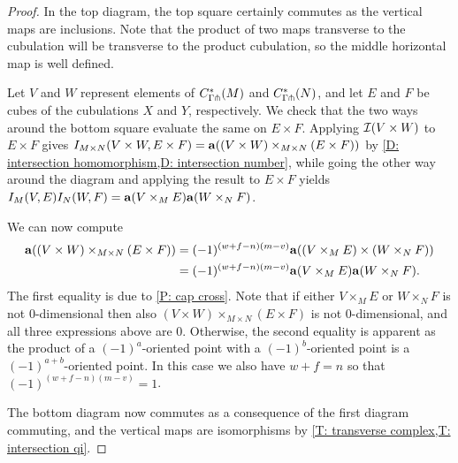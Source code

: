 \begin{proof}
	In the top diagram, the top square certainly commutes as the vertical maps are inclusions.
	Note that the product of two maps transverse to the cubulation will be transverse to the product cubulation, so the middle horizontal map is well defined.

	Let $V$ and $W$ represent elements of $C^*_{\Gamma\pitchfork}(M)$ and $C^*_{\Gamma\pitchfork}(N)$, and let $E$ and $F$ be cubes of the cubulations $X$ and $Y$, respectively.
	We check that the two ways around the bottom square evaluate the same on $E \times F$.
	Applying $\mathcal{I}(V \times W)$ to $E \times F$ gives $I_{M \times N}(V \times W, E \times F) = \mathbf{a}((V \times W)\times_{M \times N}(E \times F))$ by \cref{D: intersection homomorphism,D: intersection number}, while going the other way around the diagram and applying the result to $E \times F$ yields $I_M(V,E)I_N(W,F) = \mathbf{a}(V \times_M E)\mathbf{a}(W \times_N F)$.

	We can now compute
	\begin{align*}
		\mathbf{a}((V \times W)\times_{M \times N}(E \times F))& = (-1)^{(w+f-n)(m-v)}\mathbf{a}((V \times_M E) \times (W \times_N F))\\
		& = (-1)^{(w+f-n)(m-v)}\mathbf{a}(V \times_M E)\mathbf{a}(W \times_N F).
	\end{align*}
	The first equality is due to \cref{P: cap cross}.
	Note that if either $V \times_M E$ or $W \times_N F$ is not $0$-dimensional then also $(V \times W)\times_{M \times N}(E \times F)$ is not $0$-dimensional, and all three expressions above are $0$.
	Otherwise, the second equality is apparent as the product of a $(-1)^a$-oriented point with a $(-1)^b$-oriented point is a $(-1)^{a+b}$-oriented point.
	In this case we also have $w+f = n$ so that $(-1)^{(w+f-n)(m-v)} = 1$.

	The bottom diagram now commutes as a consequence of the first diagram commuting, and the vertical maps are isomorphisms by \cref{T: transverse complex,T: intersection qi}.
\end{proof}

